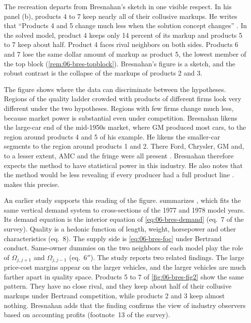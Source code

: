 The recreation departs from Bresnahan's sketch in one visible respect. In his panel (b), products 4 to 7 keep nearly
all of their collusive markups. He writes that ``Products 4 and 5 change much less when the solution concept
changes'' \citep[p.~467]{Bresnahan1987}. In the solved model, product 4 keeps only 14 percent of its markup and
products 5 to 7 keep about half. Product 4 faces rival neighbors on both sides. Products 6 and 7 lose the same dollar
amount of markup as product 5, the lowest member of the top block (\cref{rem:06-bres-topblock}). Bresnahan's figure
is a sketch, and the robust contrast is the collapse of the markups of products 2 and 3.

The figure shows where the data can discriminate between the hypotheses. Regions of the quality ladder crowded with
products of different firms look very different under the two hypotheses. Regions with few firms change much less,
because market power is substantial even under competition. Bresnahan likens the large-car end of the mid-1950s
market, where GM produced most cars, to the region around products 4 and 5 of his example. He likens the
smaller-car segments to the region around products 1 and 2. There Ford, Chrysler, GM and, to a lesser extent, AMC
and the fringe were all present \citep[p.~467]{Bresnahan1987}. Bresnahan therefore expects the method to have statistical power in this industry. He also notes that the
method would be less revealing if every producer had a full product line \citep[p.~467]{Bresnahan1987}.
 makes this precise.

An earlier study supports this reading of the figure. \citet[pp.~1021--1022]{Bresnahan1989} summarizes
\citet{Bresnahan1981}, which fits the same vertical demand system to cross-sections of the 1977 and 1978 model
years. Its demand equation is the interior equation of \eqref{eq:06-bres-demand} (eq.~7 of the survey). Quality is
a hedonic function of length, weight, horsepower and other characteristics (eq.~8). The supply side is
\eqref{eq:06-bres-foc} under Bertrand conduct. Same-owner dummies on the two neighbors of each model play the role
of $\Omega_{j,j+1}$ and $\Omega_{j,j-1}$ (eq.~6$''$). The study reports two related findings. The large
price-cost margins appear on the larger vehicles, and the larger vehicles are much farther apart in quality space.
Products 5 to 7 of \cref{fig:06-bres-fig2} show the same pattern. They have no close rival, and they keep about
half of their collusive markups under Bertrand competition, while products 2 and 3 keep almost nothing. Bresnahan
adds that the finding confirms the view of industry observers based on accounting profits (footnote~13 of the
survey).

